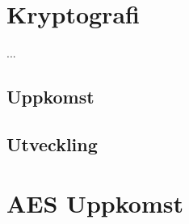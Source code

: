 
\section{Kryptografi} %
...

\subsection{Uppkomst} %

\subsection{Utveckling} %

\section{AES Uppkomst} %

